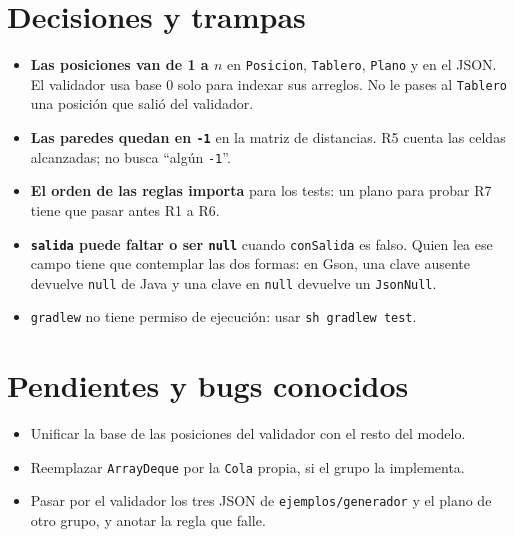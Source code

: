 \documentclass[11pt,a4paper]{article}
\begin{document}
\section{Decisiones y trampas}

\begin{itemize}
  \item \textbf{Las posiciones van de 1 a $n$} en \texttt{Posicion},
        \texttt{Tablero}, \texttt{Plano} y en el JSON. El validador usa base 0
        solo para indexar sus arreglos. No le pases al \texttt{Tablero} una
        posici\'on que sali\'o del validador.
  \item \textbf{Las paredes quedan en \texttt{-1}} en la matriz de distancias.
        R5 cuenta las celdas alcanzadas; no busca ``alg\'un \texttt{-1}''.
  \item \textbf{El orden de las reglas importa} para los tests: un plano para
        probar R7 tiene que pasar antes R1 a R6.
  \item \textbf{\texttt{salida} puede faltar o ser \texttt{null}} cuando
        \texttt{conSalida} es falso. Quien lea ese campo tiene que
        contemplar las dos formas: en Gson, una clave ausente devuelve
        \texttt{null} de Java y una clave en \texttt{null} devuelve un
        \texttt{JsonNull}.
  \item \texttt{gradlew} no tiene permiso de ejecuci\'on: usar
        \texttt{sh gradlew test}.
\end{itemize}

\section{Pendientes y bugs conocidos}

\begin{itemize}
  \item Unificar la base de las posiciones del validador con el resto del
        modelo.
  \item Reemplazar \texttt{ArrayDeque} por la \texttt{Cola} propia, si el
        grupo la implementa.
  \item Pasar por el validador los tres JSON de \texttt{ejemplos/generador} y
        el plano de otro grupo, y anotar la regla que falle.
\end{itemize}
\end{document}
